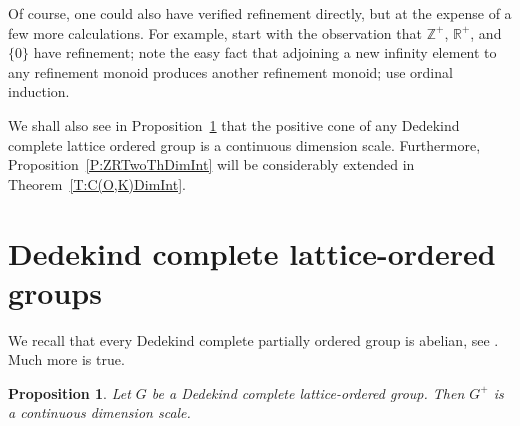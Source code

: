 \documentclass[psamsfonts,reqno]{memo-l}
\theoremstyle{plain}
\newtheorem{proposition}[lemma]{Proposition}
\theoremstyle{definition}
\theoremstyle{remark}
\numberwithin{equation}{section}
\newcommand{\ZZ}{\mathbb{Z}}
\newcommand{\RR}{\mathbb{R}}
\newcommand{\set}[1]{\{#1\}}
\begin{document}
Of course, one could also have verified refinement directly, but at the
expense of a few more calculations. For example, start with the observation
that $\ZZ^+$, $\RR^+$, and $\set{0}$ have refinement; note the easy fact that
adjoining a new infinity element to any refinement monoid
 produces another
refinement monoid; use ordinal induction.

We shall also see in Proposition~\ref{P:lgrpDI} that the positive cone
of any Dedekind complete lattice ordered group is a continuous dimension scale. Furthermore,
Proposition~\ref{P:ZRTwoThDimInt} will be considerably extended in
Theorem~\ref{T:C(O,K)DimInt}.

\section{Dedekind complete lattice-ordered groups}\label{S:Dcpllgrp}

We recall that every Dedekind complete partially ordered group is abelian,
see \cite[Theorem~28]{Birk}. Much more is true.

\begin{proposition}\label{P:lgrpDI}
Let $G$ be a Dedekind complete lattice-ordered group. Then $G^+$ is a
continuous dimension scale.
\end{proposition}
\end{document}
